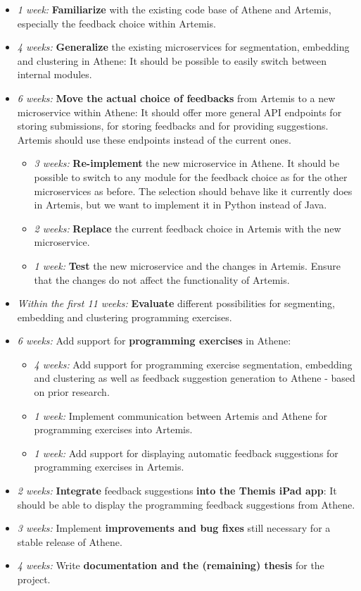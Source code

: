 \begin{itemize}
    \item \textit{1 week:} \textbf{Familiarize} with the existing code base of Athene and Artemis, especially the feedback choice within Artemis.
    \item \textit{4 weeks:} \textbf{Generalize} the existing microservices for segmentation, embedding and clustering in Athene: It should be possible to easily switch between internal modules.
    \item \textit{6 weeks:} \textbf{Move the actual choice of feedbacks} from Artemis to a new microservice within Athene: It should offer more general API endpoints for storing submissions, for storing feedbacks and for providing suggestions. Artemis should use these endpoints instead of the current ones.
    \begin{itemize}
        \item \textit{3 weeks:} \textbf{Re-implement} the new microservice in Athene. It should be possible to switch to any module for the feedback choice as for the other microservices as before. The selection should behave like it currently does in Artemis, but we want to implement it in Python instead of Java.
        \item \textit{2 weeks:} \textbf{Replace} the current feedback choice in Artemis with the new microservice.
        \item \textit{1 week:} \textbf{Test} the new microservice and the changes in Artemis. Ensure that the changes do not affect the functionality of Artemis.
    \end{itemize}
    \item \textit{Within the first 11 weeks:} \textbf{Evaluate} different possibilities for segmenting, embedding and clustering programming exercises. %
    \item \textit{6 weeks:} Add support for \textbf{programming exercises} in Athene:
    \begin{itemize}
        \item \textit{4 weeks:} Add support for programming exercise segmentation, embedding and clustering as well as feedback suggestion generation to Athene - based on prior research.
        \item \textit{1 week:} Implement communication between Artemis and Athene for programming exercises into Artemis.
        \item \textit{1 week:} Add support for displaying automatic feedback suggestions for programming exercises in Artemis.
    \end{itemize}
    \item \textit{2 weeks:} \textbf{Integrate} feedback suggestions \textbf{into the Themis iPad app}: It should be able to display the programming feedback suggestions from Athene.
    \item \textit{3 weeks:} Implement \textbf{improvements and bug fixes} still necessary for a stable release of Athene.
    \item \textit{4 weeks:} Write \textbf{documentation and the (remaining) thesis} for the project.
\end{itemize}


\clearpage

\clearpage




